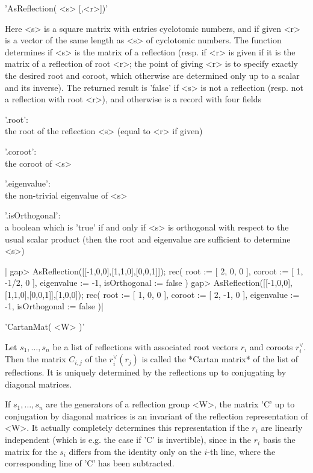 
'AsReflection( <s> [,<r>])'

Here  <s> is a square matrix with  entries cyclotomic numbers, and if given
<r>  is  a  vector  of  the  same  length as <s> of cyclotomic numbers. The
function  determines if <s> is the matrix  of a reflection (resp. if <r> is
given  if it is the matrix of a reflection of root <r>; the point of giving
<r>  is to specify exactly the desired root and coroot, which otherwise are
determined  only up to  a scalar and  its inverse). The  returned result is
'false'  if <s> is not a reflection (resp. not a reflection with root <r>),
and otherwise is a record with four fields \:

'.root':   \\ the root of the reflection <s> (equal to <r> if given)

'.coroot': \\ the coroot of <s>

'.eigenvalue': \\ the non-trivial eigenvalue of <s>

'.isOrthogonal':  \\ a  boolean  which is  'true' if  and  only if  <s> is
  orthogonal  with respect to  the usual scalar  product (then the root and
  eigenvalue are sufficient to determine <s>)

|    gap> AsReflection([[-1,0,0],[1,1,0],[0,0,1]]);
    rec(
      root := [ 2, 0, 0 ],
      coroot := [ 1, -1/2, 0 ],
      eigenvalue := -1,
      isOrthogonal := false )
    gap> AsReflection([[-1,0,0],[1,1,0],[0,0,1]],[1,0,0]);
    rec(
      root := [ 1, 0, 0 ],
      coroot := [ 2, -1, 0 ],
      eigenvalue := -1,
      isOrthogonal := false )|


'CartanMat( <W> )'

Let  $s_1,\ldots,s_n$ be a list of reflections with associated root vectors
$r_i$   and  coroots   $r_i^\vee$.  Then   the  matrix   $C_{i,j}$  of  the
$r_i^\vee(r_j)$  is called the *Cartan matrix*  of the list of reflections.
It  is uniquely determined by the reflections up to conjugating by diagonal
matrices.

If  $s_1,\ldots,s_n$  are  the  generators  of  a reflection group <W>, the
matrix  'C' up to conjugation  by diagonal matrices is  an invariant of the
reflection  representation of  <W>. It  actually completely determines this
representation  if the  $r_i$ are  linearly independent  (which is e.g. the
case  if 'C' is  invertible), since in  the $r_i$ basis  the matrix for the
$s_i$  differs  from  the  identity  only  on  the  $i$-th  line, where the
corresponding line of 'C' has been subtracted.

